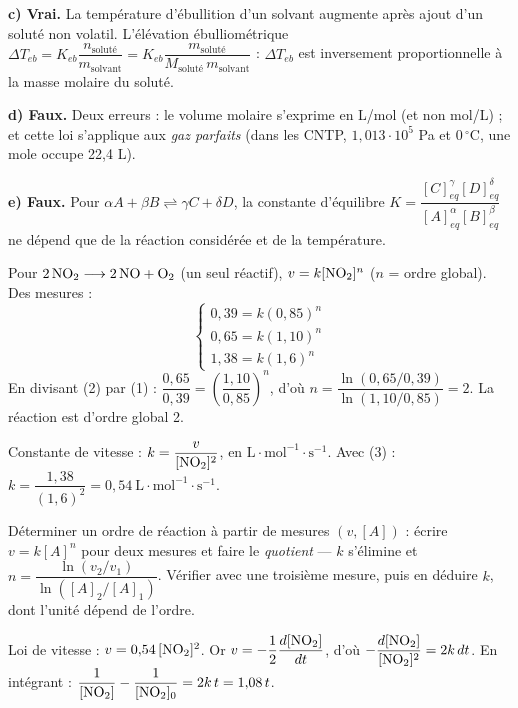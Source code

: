\documentclass[11pt]{article}
\begin{document}
\textbf{c) Vrai.} La température d'ébullition d'un solvant augmente après ajout d'un soluté non volatil. L'élévation ébulliométrique $\Delta T_{eb} = K_{eb}\dfrac{n_{\text{soluté}}}{m_{\text{solvant}}} = K_{eb}\dfrac{m_{\text{soluté}}}{M_{\text{soluté}}\,m_{\text{solvant}}}$ : $\Delta T_{eb}$ est inversement proportionnelle à la masse molaire du soluté.

\textbf{d) Faux.} Deux erreurs : le volume molaire s'exprime en L/mol (et non mol/L) ; et cette loi s'applique aux \emph{gaz parfaits} (dans les CNTP, $1{,}013\cdot10^{5}$ Pa et $0\,^\circ$C, une mole occupe 22,4 L).

\textbf{e) Faux.} Pour $\alpha A + \beta B \rightleftharpoons \gamma C + \delta D$, la constante d'équilibre $K = \dfrac{[C]_{eq}^{\gamma}[D]_{eq}^{\delta}}{[A]_{eq}^{\alpha}[B]_{eq}^{\beta}}$ ne dépend que de la réaction considérée et de la température.


 Pour $\mathrm{2\,NO_2 \longrightarrow 2\,NO + O_2}$ (un seul réactif), $v = k[\mathrm{NO_2}]^n$ ($n$ = ordre global). Des mesures :
\[ \begin{cases} 0{,}39 = k(0{,}85)^n \\ 0{,}65 = k(1{,}10)^n \\ 1{,}38 = k(1{,}6)^n \end{cases} \]
En divisant (2) par (1) : $\dfrac{0{,}65}{0{,}39} = \left(\dfrac{1{,}10}{0{,}85}\right)^n$, d'où $n = \dfrac{\ln(0{,}65/0{,}39)}{\ln(1{,}10/0{,}85)} = 2$. La réaction est d'ordre global 2.

Constante de vitesse : $k = \dfrac{v}{[\mathrm{NO_2}]^2}$, en $\text{L}\cdot\text{mol}^{-1}\cdot\text{s}^{-1}$. Avec (3) : $k = \dfrac{1{,}38}{(1{,}6)^2} = 0{,}54\ \text{L}\cdot\text{mol}^{-1}\cdot\text{s}^{-1}$.

\begin{methode}
Déterminer un ordre de réaction à partir de mesures $(v, [A])$ :
écrire $v = k[A]^n$ pour deux mesures et faire le \emph{quotient} — $k$
s'élimine et $n = \dfrac{\ln(v_2/v_1)}{\ln([A]_2/[A]_1)}$. Vérifier
avec une troisième mesure, puis en déduire $k$, dont l'unité dépend de
l'ordre.
\end{methode}

 Loi de vitesse : $v = 0{,}54\,[\mathrm{NO_2}]^2$. Or $v = -\dfrac{1}{2}\dfrac{d[\mathrm{NO_2}]}{dt}$, d'où $-\dfrac{d[\mathrm{NO_2}]}{[\mathrm{NO_2}]^2} = 2k\,dt$. En intégrant : $\dfrac{1}{[\mathrm{NO_2}]} - \dfrac{1}{[\mathrm{NO_2}]_0} = 2k\,t = 1{,}08\,t$.
\end{document}
